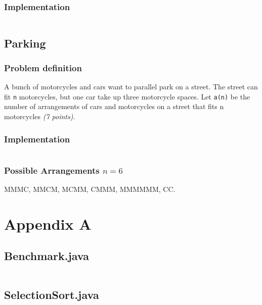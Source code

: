 \documentclass[english,a4paper,]{report}
\begin{document}
\subsection{Implementation}\label{implementation}

\inputminted[firstline=6,lastline=9]{haskell}{code_samples/Pizza.hs}

\section{Parking}\label{parking}

\subsection{Problem definition}\label{problem-definition-1}

A bunch of motorcycles and cars want to parallel park on a street. The
street can fit \texttt{n} motorcycles, but one car take up three
motorcycle spaces. Let \texttt{a(n)} be the number of arrangements of
cars and motorcycles on a street that fits n motorcycles \emph{(7
points)}.

\subsection{Implementation}\label{implementation-1}

\inputminted[firstline=6,lastline=11]{haskell}{code_samples/Parking.hs}

\subsection{\texorpdfstring{Possible Arrangements
\(n = 6\)}{Possible Arrangements n = 6}}\label{possible-arrangements-n-6}

MMMC, MMCM, MCMM, CMMM, MMMMMM, CC.

\chapter{Appendix A}\label{appendix-a}

\section{Benchmark.java}\label{benchmark.java}

\inputminted{java}{code_samples/Benchmark.java}

\section{SelectionSort.java}\label{selectionsort.java}
\end{document}
